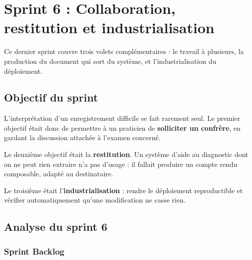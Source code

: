 \chapter{Sprint 6 : Collaboration, restitution et industrialisation}
\label{chap:sprint6}


Ce dernier sprint couvre trois volets complémentaires : le travail à plusieurs, la production
du document qui sort du système, et l'industrialisation du déploiement.

\section{Objectif du sprint}

L'interprétation d'un enregistrement difficile se fait rarement seul. Le premier objectif
était donc de permettre à un praticien de \textbf{solliciter un confrère}, en gardant la
discussion attachée à l'examen concerné.

Le deuxième objectif était la \textbf{restitution}. Un système d'aide au diagnostic dont on ne
peut rien extraire n'a pas d'usage : il fallait produire un compte rendu composable, adapté au
destinataire.

Le troisième était l'\textbf{industrialisation} : rendre le déploiement reproductible et
vérifier automatiquement qu'une modification ne casse rien.

\section{Analyse du sprint 6}

\subsection{Sprint Backlog}

